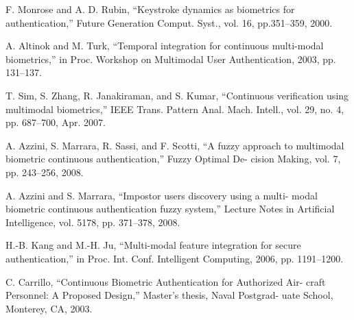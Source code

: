 \begin{thebibliography}{77}
F. Monrose and A. D. Rubin, 
“Keystroke dynamics as biometrics for authentication,” 
Future Generation Comput. Syst., vol. 16, pp.351–359, 2000.

A. Altinok and M. Turk, 
“Temporal integration for continuous multi-modal biometrics,”
in Proc. Workshop on Multimodal User Authentication, 2003, pp. 131–137.

T. Sim, S. Zhang, R. Janakiraman, and S. Kumar, 
“Continuous verification using multimodal biometrics,” 
IEEE Trans. Pattern Anal. Mach. Intell., vol. 29, no. 4, pp. 687–700, Apr. 2007.

A. Azzini, S. Marrara, R. Sassi, and F. Scotti, “A fuzzy approach to
multimodal biometric continuous authentication,” Fuzzy Optimal De-
cision Making, vol. 7, pp. 243–256, 2008.

A. Azzini and S. Marrara, “Impostor users discovery using a multi-
modal biometric continuous authentication fuzzy system,” Lecture
Notes in Artificial Intelligence, vol. 5178, pp. 371–378, 2008.

H.-B. Kang and M.-H. Ju, “Multi-modal feature integration for secure
authentication,” in Proc. Int. Conf. Intelligent Computing, 2006, pp.
1191–1200.

C. Carrillo, “Continuous Biometric Authentication for Authorized Air-
craft Personnel: A Proposed Design,” Master’s thesis, Naval Postgrad-
uate School, Monterey, CA, 2003.

\end{thebibliography}

